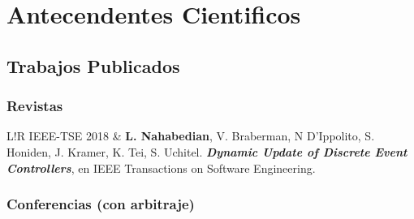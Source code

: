 \documentclass[10pt]{article}
\newcommand\VRule{\color{lightgray}\vrule width 0.5pt}
\begin{document}
\newpage

\section{Antecendentes Cientificos}

\subsection{Trabajos Publicados}

\subsubsection*{Revistas}

\begin{tabular}{L!{\VRule}R}
IEEE-TSE 2018 & \textbf{L. Nahabedian}, V. Braberman, N D'Ippolito, S. Honiden, J. Kramer, K. Tei, 
S. Uchitel.
\textbf{\textit{Dynamic Update of Discrete Event Controllers}}, en IEEE Transactions on Software 
Engineering.
\end{tabular}

\subsubsection*{Conferencias (con arbitraje)}
\end{document}
